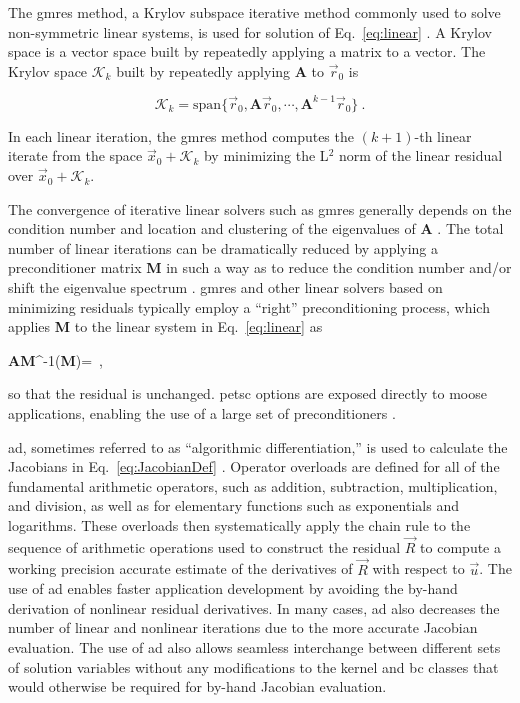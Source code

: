 \noindent The \gls{gmres} method, a Krylov subspace iterative method commonly used to solve non-symmetric linear systems, is used for solution of Eq.\ \eqref{eq:linear} \cite{saad}. A Krylov space is a vector space built by repeatedly applying a matrix to a vector. The Krylov space \(\mathcal{K}_k\) built by repeatedly applying \(\textbf{A}\) to \(\vec{r}_0\) is

\begin{equation}
\label{eq:krylov_space}
\mathcal{K}_k=\textrm{span}\{\vec{r}_0, \textbf{A}\vec{r}_0, \cdots, \textbf{A}^{k-1}\vec{r}_0\}\ .
\end{equation}

\noindent In each linear iteration, the \gls{gmres} method computes the \((k+1)\)-th linear iterate from the space \(\vec{x}_0+\mathcal{K}_k\) by minimizing the L$^2$ norm of the linear residual over \(\vec{x}_0+\mathcal{K}_k\). 

The convergence of iterative linear solvers such as \gls{gmres} generally depends on the condition number and location and clustering of the eigenvalues of \textbf{A} \cite{trefethen}. The total number of linear iterations can be dramatically reduced by applying a preconditioner matrix \textbf{M} in such a way as to reduce the condition number and/or shift the eigenvalue spectrum \cite{benzi}. \gls{gmres} and other linear solvers based on minimizing residuals typically employ a ``right'' preconditioning process, which applies \textbf{M} to the linear system in Eq.\ \eqref{eq:linear} as

\beq
\textbf{A}\textbf{M}^{-1}(\textbf{M})=\ ,
\eeq

\noindent so that the residual is unchanged. \gls{petsc} options are exposed directly to \gls{moose} applications, enabling the use of a large set of preconditioners \cite{petsc}.

\gls{ad}, sometimes referred to as ``algorithmic differentiation,'' is used to calculate the Jacobians in Eq.\ \eqref{eq:JacobianDef} \cite{ad}. Operator overloads are defined for all of the fundamental arithmetic operators, such as addition, subtraction, multiplication, and division, as well as for elementary functions such as exponentials and logarithms. These overloads then systematically apply the chain rule to the sequence of arithmetic operations used to construct the residual \(\vec{R}\) to compute a working precision accurate estimate of the derivatives of \(\vec{R}\) with respect to \(\vec{u}\). The use of \gls{ad} enables faster application development by avoiding the by-hand derivation of nonlinear residual derivatives. In many cases, \gls{ad} also decreases the number of linear and nonlinear iterations due to the more accurate Jacobian evaluation. The use of \gls{ad} also allows seamless interchange between different sets of solution variables without any modifications to the kernel and \gls{bc} classes that would otherwise be required for by-hand Jacobian evaluation.

